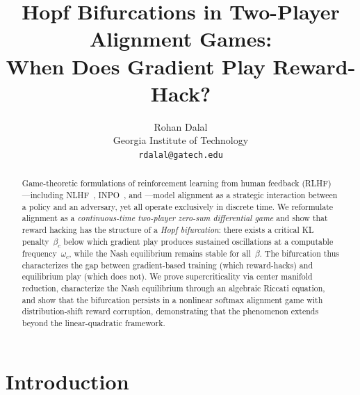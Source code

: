 \documentclass[10pt]{article}
\title{Hopf Bifurcations in Two-Player Alignment Games:\\
When Does Gradient Play Reward-Hack?}
\author{
  Rohan Dalal \\
  Georgia Institute of Technology \\
  \texttt{rdalal@gatech.edu}
}
\date{}
\begin{document}
\maketitle

\begin{abstract}
Game-theoretic formulations of reinforcement learning from human feedback (RLHF)---including NLHF~\citep{munos2024nash}, INPO~\citep{inpo2025}, and \citet{starlhf2024}---model alignment as a strategic interaction between a policy and an adversary, yet all operate exclusively in discrete time.
We reformulate alignment as a \emph{continuous-time two-player zero-sum differential game} and show that reward hacking has the structure of a \emph{Hopf bifurcation}: there exists a critical KL penalty~$\beta_c$ below which gradient play produces sustained oscillations at a computable frequency~$\omega_c$, while the Nash equilibrium remains stable for all~$\beta$.
The bifurcation thus characterizes the gap between gradient-based training (which reward-hacks) and equilibrium play (which does not).
We prove supercriticality via center manifold reduction, characterize the Nash equilibrium through an algebraic Riccati equation, and show that the bifurcation persists in a nonlinear softmax alignment game with distribution-shift reward corruption, demonstrating that the phenomenon extends beyond the linear-quadratic framework.
\end{abstract}

\section{Introduction}
\label{sec:intro}
\end{document}
